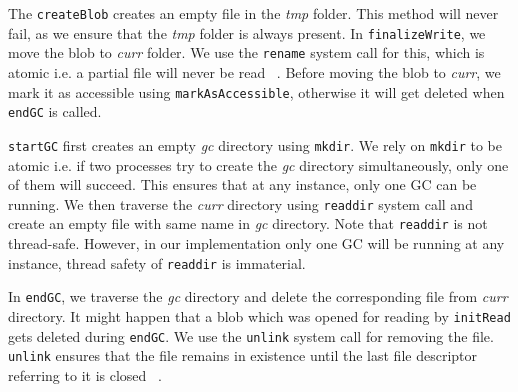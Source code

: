 The \texttt{createBlob} creates an empty file in the \textit{tmp} folder. This method will never fail, as we ensure that the \textit{tmp} folder is always present.
In \texttt{finalizeWrite}, we move the blob to \textit{curr} folder. We use the \texttt{rename} system call for this, which is atomic i.e. a partial file will never be read ~\cite{renamemanpage}.
Before moving the blob to \textit{curr}, we mark it as accessible using \texttt{markAsAccessible}, otherwise it will get deleted when \texttt{endGC} is called.

\texttt{startGC} first creates an empty \textit{gc} directory using \texttt{mkdir}. We rely on \texttt{mkdir} to be atomic i.e. if two processes try to create the \textit{gc} directory simultaneously, only one of them will succeed.
This ensures that at any instance, only one GC can be running.
We then traverse the \textit{curr} directory using \texttt{readdir} system call and create an empty file with same name in \textit{gc} directory. Note that \texttt{readdir} is not thread-safe. However, in our implementation only one GC will be running at any instance, thread safety of \texttt{readdir} is immaterial.

In \texttt{endGC}, we traverse the \textit{gc} directory and delete the corresponding file from \textit{curr} directory. It might happen that a blob which was opened for reading by \texttt{initRead} gets deleted during \texttt{endGC}.
We use the \texttt{unlink} system call for removing the file. \texttt{unlink} ensures that the file remains in existence until the last file descriptor referring to it is closed ~\cite{unlinkmanpage}.
